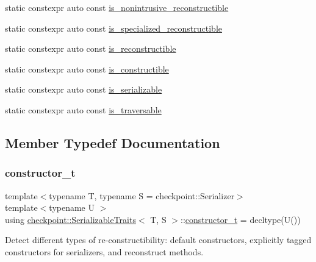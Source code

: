 \begin{DoxyCompactItemize}
static constexpr auto const \hyperlink{structcheckpoint_1_1_serializable_traits_a35d5afbe97197885a1513765a210837c}{is\+\_\+nonintrusive\+\_\+reconstructible}
\item 
static constexpr auto const \hyperlink{structcheckpoint_1_1_serializable_traits_a305317a4e8fb44498f195a39bf59ad2d}{is\+\_\+specialized\+\_\+reconstructible}
\item 
static constexpr auto const \hyperlink{structcheckpoint_1_1_serializable_traits_a6cc78a7cc9b4645727c92437619fce83}{is\+\_\+reconstructible}
\item 
static constexpr auto const \hyperlink{structcheckpoint_1_1_serializable_traits_a7720e2f57d1b3d2f87fd022b47d0b775}{is\+\_\+constructible}
\item 
static constexpr auto const \hyperlink{structcheckpoint_1_1_serializable_traits_a3941c4fcb5397fe564a3453857aa9183}{is\+\_\+serializable}
\item 
static constexpr auto const \hyperlink{structcheckpoint_1_1_serializable_traits_a426639501cd0ce23cb14c7b2ff982fc1}{is\+\_\+traversable}
\end{DoxyCompactItemize}


\subsection{Member Typedef Documentation}
\mbox{\label{structcheckpoint_1_1_serializable_traits_aa0430155930461d346b90681db234d84}} 
\subsubsection{\texorpdfstring{constructor\+\_\+t}{constructor\_t}}
{\footnotesize\ttfamily template$<$typename T, typename S = checkpoint\+::\+Serializer$>$ \\
template$<$typename U $>$ \\
using \hyperlink{structcheckpoint_1_1_serializable_traits}{checkpoint\+::\+Serializable\+Traits}$<$ T, S $>$\+::\hyperlink{structcheckpoint_1_1_serializable_traits_aa0430155930461d346b90681db234d84}{constructor\+\_\+t} =  decltype(U())}

Detect different types of re-\/constructibility\+: default constructors, explicitly tagged constructors for serializers, and reconstruct methods. \mbox{\label{structcheckpoint_1_1_serializable_traits_a8e42305be1264b105f525ae7dff36c15}} 
